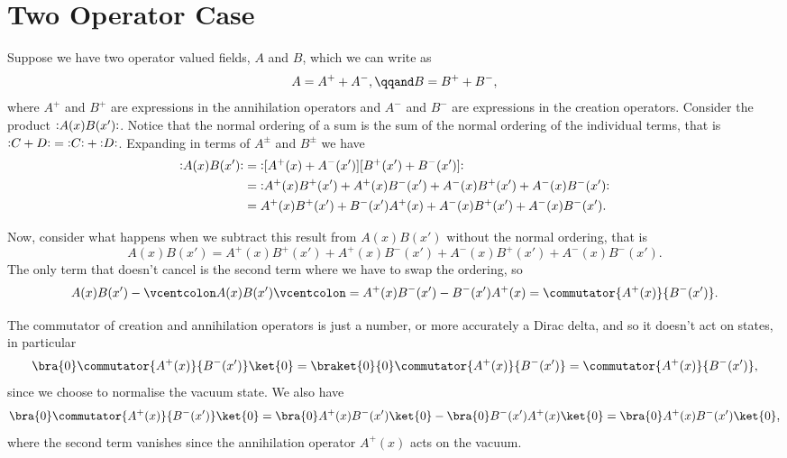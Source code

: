\documentclass[fleqn]{NotesClass}
\newcommand{\normalordering}[1]{\mathopen{\vcentcolon}{#1}\mathclose{\vcentcolon}}
\begin{document}
    \section{Two Operator Case}
    Suppose we have two operator valued fields, \(A\) and \(B\), which we can write as
    \begin{equation}
        A = A^+ + A^-, \qqand B = B^+ + B^-,
    \end{equation}
    where \(A^+\) and \(B^+\) are expressions in the annihilation operators and \(A^-\) and \(B^-\) are expressions in the creation operators.
    Consider the product \(\normalordering{A(x)B(x')}\).
    Notice that the normal ordering of a sum is the sum of the normal ordering of the individual terms, that is \(\normalordering{C + D} = \normalordering{C} + \normalordering{D}\).
    Expanding in terms of \(A^{\pm}\) and \(B^{\pm}\) we have
    \begin{align*}
        \normalordering{A(x)B(x')} &= \normalordering{[A^+(x) + A^-(x')][B^+(x') + B^-(x')]}\\
        &= \normalordering{A^+(x)B^+(x') + A^+(x)B^-(x') + A^-(x)B^+(x') + A^-(x)B^-(x')}\\
        &= A^+(x)B^+(x') + B^-(x')A^+(x) + A^-(x)B^+(x') + A^-(x)B^-(x').
    \end{align*}
    
    Now, consider what happens when we subtract this result from \(A(x)B(x')\) without the normal ordering, that is
    \begin{equation}
        A(x)B(x') = A^+(x)B^+(x') + A^+(x)B^-(x') + A^-(x)B^+(x') + A^-(x)B^-(x').
    \end{equation}
    The only term that doesn't cancel is the second term where we have to swap the ordering, so
    \begin{equation}
        A(x)B(x') - \normalordering{A(x)B(x')} = A^+(x)B^-(x') - B^-(x')A^+(x) = \commutator{A^+(x)}{B^-(x')}.
    \end{equation}
    
    The commutator of creation and annihilation operators is just a number, or more accurately a Dirac delta, and so it doesn't act on states, in particular
    \begin{equation}
        \bra{0} \commutator{A^+(x)}{B^-(x')}\ket{0} = \braket{0}{0} \commutator{A^+(x)}{B^-(x')} = \commutator{A^+(x)}{B^-(x')},
    \end{equation}
    since we choose to normalise the vacuum state.
    We also have
    \begin{equation}
        \bra{0} \commutator{A^+(x)}{B^-(x')}\ket{0} = \bra{0} A^+(x)B^-(x')\ket{0} - \bra{0} B^-(x')A^+(x)\ket{0} = \bra{0} A^+(x)B^-(x')\ket{0},
    \end{equation}
    where the second term vanishes since the annihilation operator \(A^+(x)\) acts on the vacuum.
    
\end{document}
